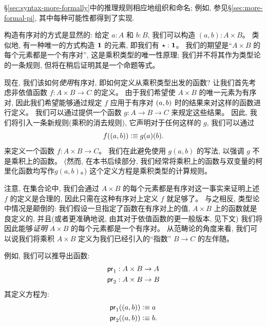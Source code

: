 \begin{rmk}
\begin{enumerate}
  \end{enumerate}
  
  \S\ref{sec:syntax-more-formally}中的推理规则相应地组织和命名; 例如, 参见\S\ref{sec:more-formal-pi}, 其中每种可能性都得到了实现.
\end{rmk}

构造有序对的方式是显然的: 给定 $a:A$ 和 $b:B$, 我们可以构造 $(a,b):A\times B$。
类似地, 有一种唯一的方式构造 $\mathbf{1}$ 的元素, 即我们有 $\star:\mathbf{1}$。
我们的期望是``$A\times B$ 的每个元素都是一个有序对'', 这是乘积类型的唯一性原理;
我们并不将其作为类型论的一条规则, 但将在稍后证明其是一个命题等式。

现在, 我们该如何\emph{使用}有序对, 即如何定义从乘积类型出发的函数?
让我们首先考虑非依值函数 $f : A\times B \to C$ 的定义。
由于我们希望使 $A\times B$ 的唯一元素为有序对, 因此我们希望能够通过规定 $f$ 应用于有序对 $(a,b)$ 时的结果来对这样的函数进行定义。
我们可以通过提供一个函数 $g : A \to B \to C$ 来规定这些结果。
因此, 我们将引入一条新规则(乘积的消去规则), 它声明对于任何这样的 $g$, 我们可以通过
\[ f((a,b)) \vcentcolon\equiv g(a)(b). \]
来定义一个函数 $f : A\times B \to C$。
我们在此避免使用 $g(a,b)$ 的写法, 以强调 $g$ 不是乘积上的函数。
(然而, 在本书后续部分, 我们经常将乘积上的函数与双变量的柯里化函数均写作$g(a,b)$。)
这个定义方程是乘积类型的计算规则。

注意, 在集合论中, 我们会通过 $A\times B$ 的每个元素都是有序对这一事实来证明上述 $f$ 的定义是合理的, 因此只需在这种有序对上定义 $f$ 就足够了。
与之相反, 类型论中情况是颠倒的: 我们假设一旦指定了函数在有序对上的值,  $A\times B$ 上的函数就是良定义的, 并且(或者更准确地说, 由其对于依值函数的更一般版本, 见下文)
我们将因此能够\emph{证明} $A\times B$ 的每个元素都是一个有序对。
从范畴论的角度来看, 我们可以说我们将乘积 $A\times B$ 定义为我们已经引入的``指数'' $B\to C$ 的左伴随。

例如, 我们可以推导出函数:
%
%
%
%
\begin{align*}
  \mathsf{pr}_{1} & :  A \times B \to A \\
  \mathsf{pr}_{2} & :  A \times B \to B
\end{align*}
其定义方程为:
\begin{align*}
  \mathsf{pr}_{1}((a,b)) & \vcentcolon\equiv  a \\
  \mathsf{pr}_{2}((a,b)) & \vcentcolon\equiv  b.
\end{align*}


